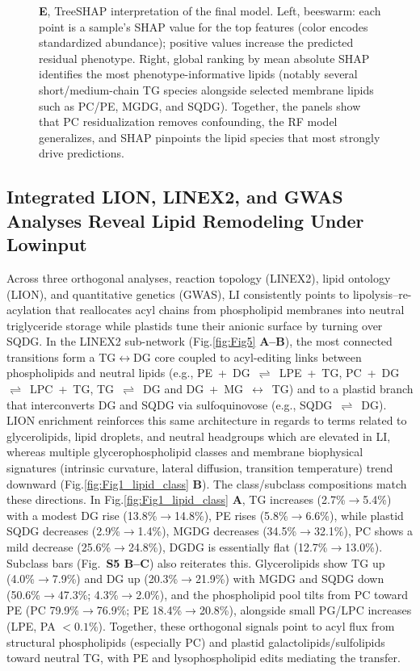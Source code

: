 \documentclass[10pt,letterpaper]{article}
\begin{document}
\begin{itemize}
\begin{figure}[!ht]
{  \textbf{E}, TreeSHAP interpretation of the final model. Left, beeswarm: each point is a sample’s SHAP value for the top features (color encodes standardized abundance); positive values increase the predicted residual phenotype. Right, global ranking by mean absolute SHAP identifies the most phenotype-informative lipids (notably several short/medium-chain TG species alongside selected membrane lipids such as PC/PE, MGDG, and SQDG). 
  Together, the panels show that PC residualization removes confounding, the RF model generalizes, and SHAP pinpoints the lipid species that most strongly drive predictions.}
  \label{fig:fig4_rf_shap}
\end{figure}





\subsection*{Integrated LION, LINEX2, and GWAS Analyses Reveal Lipid Remodeling Under Lowinput}
Across three orthogonal analyses, reaction topology (LINEX2), lipid ontology (LION), and quantitative genetics (GWAS), LI consistently points to lipolysis–re-acylation that reallocates acyl chains from phospholipid membranes into neutral triglyceride storage while plastids tune their anionic surface by turning over SQDG. In the LINEX2 sub-network (Fig.\ref{fig:Fig5} \textbf{A–B}), the most connected transitions form a TG$\leftrightarrow$DG core coupled to acyl-editing links between phospholipids and neutral lipids (e.g., \mbox{PE + DG $\rightleftharpoons$ LPE + TG}, \mbox{PC + DG $\rightleftharpoons$ LPC + TG}, \mbox{TG $\rightleftharpoons$ DG} and \mbox{DG + MG $\leftrightarrow$ TG}) and to a plastid branch that interconverts DG and SQDG via sulfoquinovose (e.g., \mbox{SQDG  $\rightleftharpoons$ DG}). LION enrichment reinforces this same architecture in regards to terms related to glycerolipids, lipid droplets, and neutral headgroups which are elevated in LI, whereas multiple glycerophospholipid classes and membrane biophysical signatures (intrinsic curvature, lateral diffusion, transition temperature) trend downward (Fig.\ref{fig:Fig1_lipid_class} \textbf{B}). The class/subclass compositions match these directions. In Fig.\ref{fig:Fig1_lipid_class} \textbf{A}, TG increases (2.7\%$\rightarrow$5.4\%) with a modest DG rise (13.8\%$\rightarrow$14.8\%), PE rises (5.8\%$\rightarrow$6.6\%), while plastid SQDG decreases (2.9\%$\rightarrow$1.4\%), MGDG decreases (34.5\%$\rightarrow$32.1\%), PC shows a mild decrease (25.6\%$\rightarrow$24.8\%), DGDG is essentially flat (12.7\%$\rightarrow$13.0\%). Subclass bars (Fig.\ \textbf{S5 B–C}) also reiterates this. Glycerolipids show TG up (4.0\%$\rightarrow$7.9\%) and DG up (20.3\%$\rightarrow$21.9\%) with MGDG and SQDG down (50.6\%$\rightarrow$47.3\%; 4.3\%$\rightarrow$2.0\%), and the phospholipid pool tilts from PC toward PE (PC 79.9\%$\rightarrow$76.9\%; PE 18.4\%$\rightarrow$20.8\%), alongside small PG/LPC increases (LPE, PA $<0.1\%$). Together, these orthogonal signals point to acyl flux from structural phospholipids (especially PC) and plastid galactolipids/sulfolipids toward neutral TG, with PE and lysophospholipid edits mediating the transfer.


\end{itemize}
\end{document}
